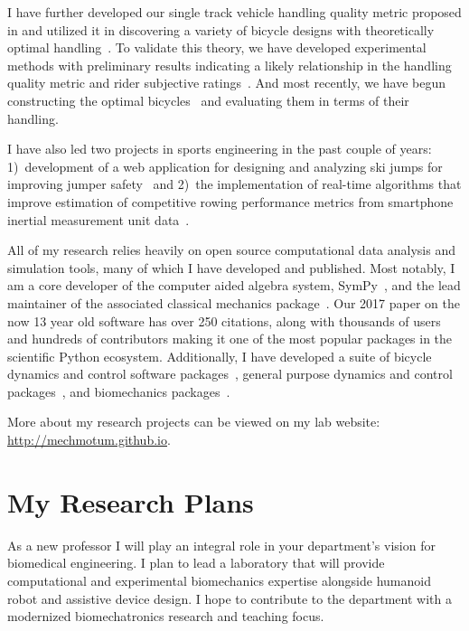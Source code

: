 \documentclass{article}
\begin{document}
I have further developed our single track vehicle handling quality metric
proposed in \cite{Hess2012} and utilized it in discovering a variety of bicycle
designs with theoretically optimal handling~\cite{Moore2016,Moore2019a}. To
validate this theory, we have developed experimental methods with preliminary
results indicating a likely relationship in the handling quality metric and
rider subjective ratings~\cite{Kresie2017}. And most recently, we have begun
constructing the optimal bicycles~\cite{Gilboa2019a} and evaluating them in
terms of their handling.

I have also led two projects in sports engineering in the past couple of years:
1)~development of a web application for designing and analyzing ski jumps for
improving jumper safety~\cite{Moore2018a,Cloud2019a} and 2)~the implementation
of real-time algorithms that improve estimation of competitive rowing
performance metrics from smartphone inertial measurement unit
data~\cite{Cloud2019b}.

All of my research relies heavily on open source computational data analysis
and simulation tools, many of which I have developed and published. Most
notably, I am a core developer of the computer aided algebra system,
SymPy~\cite{SymPyDevelopmentTeam2006}, and the lead maintainer of the
associated classical mechanics package~\cite{Gede2013}. Our 2017 paper
\cite{Meurer2017} on the now 13 year old software has over 250 citations, along
with thousands of users and hundreds of contributors making it one of the most
popular packages in the scientific Python ecosystem. Additionally, I have
developed a suite of bicycle dynamics and control software
packages~\cite{Moore2010b,Moore2011d,Moore2011a,Moore2011e}, general purpose
dynamics and control packages~\cite{Moore2014,Moore2011}, and biomechanics
packages~\cite{Dembia2011,Moore2011,Moore2011b,Moore2013b}.

More about my research projects can be viewed on my lab website:
\url{http://mechmotum.github.io}.

\section*{My Research Plans%
  \label{my-research-plans}%
}

As a new professor I will play an integral role in your department's vision for
biomedical engineering. I plan to lead a laboratory that will provide
computational and experimental biomechanics expertise alongside humanoid robot
and assistive device design. I hope to contribute to the department with a
modernized biomechatronics research and teaching focus.
\end{document}
